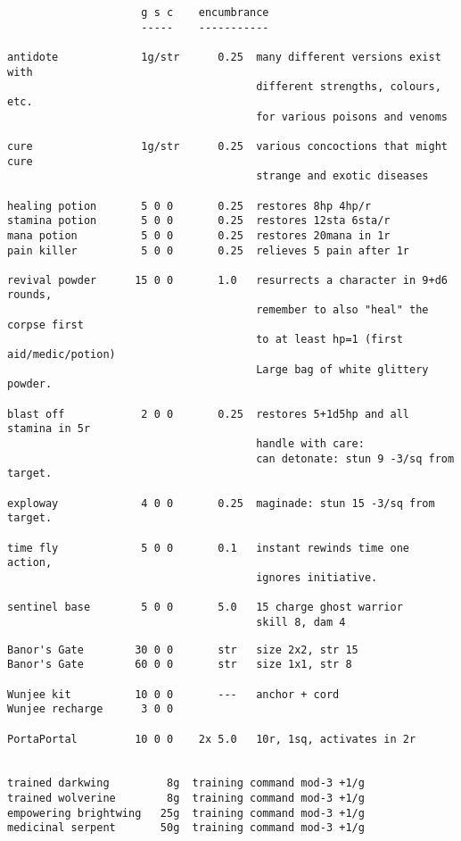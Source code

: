 \small
\begin{verbatim}
                     g s c    encumbrance
                     -----    -----------

antidote             1g/str      0.25  many different versions exist with
                                       different strengths, colours, etc.
                                       for various poisons and venoms

cure                 1g/str      0.25  various concoctions that might cure
                                       strange and exotic diseases

healing potion       5 0 0       0.25  restores 8hp 4hp/r
stamina potion       5 0 0       0.25  restores 12sta 6sta/r
mana potion          5 0 0       0.25  restores 20mana in 1r
pain killer          5 0 0       0.25  relieves 5 pain after 1r

revival powder      15 0 0       1.0   resurrects a character in 9+d6 rounds,
                                       remember to also "heal" the corpse first
                                       to at least hp=1 (first aid/medic/potion)
                                       Large bag of white glittery powder.

blast off            2 0 0       0.25  restores 5+1d5hp and all stamina in 5r
                                       handle with care:
                                       can detonate: stun 9 -3/sq from target.

exploway             4 0 0       0.25  maginade: stun 15 -3/sq from target.

time fly             5 0 0       0.1   instant rewinds time one action,
                                       ignores initiative.

sentinel base        5 0 0       5.0   15 charge ghost warrior
                                       skill 8, dam 4

\end{verbatim} \goodbreak \begin{verbatim}
Banor's Gate        30 0 0       str   size 2x2, str 15
Banor's Gate        60 0 0       str   size 1x1, str 8

Wunjee kit          10 0 0       ---   anchor + cord
Wunjee recharge      3 0 0

PortaPortal         10 0 0    2x 5.0   10r, 1sq, activates in 2r


trained darkwing         8g  training command mod-3 +1/g
trained wolverine        8g  training command mod-3 +1/g
empowering brightwing   25g  training command mod-3 +1/g
medicinal serpent       50g  training command mod-3 +1/g

\end{verbatim}
\normalsize







